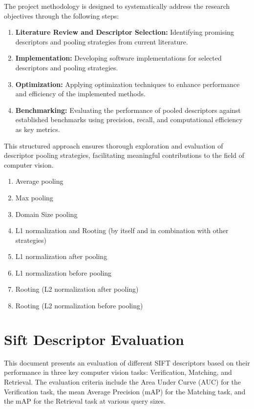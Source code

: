 The project methodology is designed to systematically address the research objectives through the following steps:

\begin{enumerate}
    \item \textbf{Literature Review and Descriptor Selection:} Identifying promising descriptors and pooling strategies from current literature.
    \item \textbf{Implementation:} Developing software implementations for selected descriptors and pooling strategies.
    \item \textbf{Optimization:} Applying optimization techniques to enhance performance and efficiency of the implemented methods.
    \item \textbf{Benchmarking:} Evaluating the performance of pooled descriptors against established benchmarks using precision, recall, and computational efficiency as key metrics.
\end{enumerate}

This structured approach ensures thorough exploration and evaluation of descriptor pooling strategies, facilitating meaningful contributions to the field of computer vision.

\begin{enumerate}
    \item Average pooling
    \item Max pooling
    \item Domain Size pooling
    \item L1 normalization and Rooting (by itself and in combination with other strategies)
    \item L1 normalization after pooling
    \item L1 normalization before pooling
    \item Rooting (L2 normalization after pooling)
    \item Rooting (L2 normalization before pooling)
\end{enumerate}


\section*{Sift Descriptor Evaluation}

This document presents an evaluation of different SIFT descriptors based on their performance in three key computer vision tasks: Verification, Matching, and Retrieval. The evaluation criteria include the Area Under Curve (AUC) for the Verification task, the mean Average Precision (mAP) for the Matching task, and the mAP for the Retrieval task at various query sizes.

